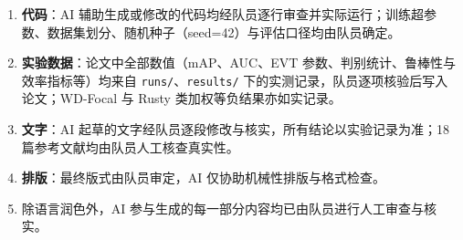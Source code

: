 \documentclass[12pt,a4paper]{ctexart}
\begin{document}
\vspace{0.8em}

\begin{enumerate}[leftmargin=2em,itemsep=4pt]
  \item \textbf{代码}：AI 辅助生成或修改的代码均经队员逐行审查并实际运行；训练超参数、数据集划分、随机种子（seed=42）与评估口径均由队员确定。
  \item \textbf{实验数据}：论文中全部数值（mAP、AUC、EVT 参数、判别统计、鲁棒性与效率指标等）均来自 \texttt{runs/}、\texttt{results/} 下的实测记录，队员逐项核验后写入论文；WD-Focal 与 Rusty 类加权等负结果亦如实记录。
  \item \textbf{文字}：AI 起草的文字经队员逐段修改与核实，所有结论以实验记录为准；18 篇参考文献均由队员人工核查真实性。
  \item \textbf{排版}：最终版式由队员审定，AI 仅协助机械性排版与格式检查。
  \item 除语言润色外，AI 参与生成的每一部分内容均已由队员进行人工审查与核实。
\end{enumerate}

\vspace{1em}
\end{document}
